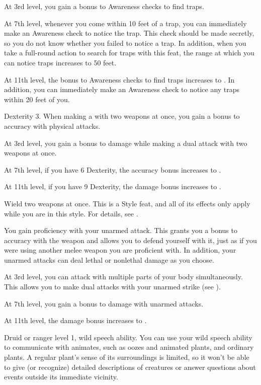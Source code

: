     At 3rd level, you gain a  bonus to Awareness checks to find traps.

    At 7th level, whenever you come within 10 feet of a trap, you can immediately make an Awareness check to notice the trap.
    This check should be made secretly, so you do not know whether you failed to notice a trap.
    In addition, when you take a full-round action to search for traps with this feat, the range at which you can notice traps increases to 50 feet.

    At 11th level, the bonus to Awareness checks to find traps increases to .
    In addition, you can immediately make an Awareness check to notice any traps within 20 feet of you.

    \featpre Dexterity 3.
    \featben When making a  with two weapons at once, you gain a  bonus to accuracy with physical attacks.

    At 3rd level, you gain a  bonus to damage while making a dual attack with two weapons at once.

    At 7th level, if you have 6 Dexterity, the accuracy bonus increases to .

    At 11th level, if you have 9 Dexterity, the damage bonus increases to .

    \stylereq Wield two weapons at once.
     This is a Style feat, and all of its effects only apply while you are in this style.
    For details, see .

    \featben You gain proficiency with your unarmed attack.
    This grants you a  bonus to accuracy with the weapon and allows you to defend yourself with it, just as if you were using another melee weapon you are proficient with.
    In addition, your unarmed attacks can deal lethal or nonlethal damage as you choose.

    At 3rd level, you can attack with multiple parts of your body simultaneously.
    This allows you to make dual attacks with your unarmed strike (see ).

    At 7th level, you gain a  bonus to damage with unarmed attacks.

    At 11th level, the damage bonus increases to .

    \featpres Druid or ranger level 1, wild speech ability.
    \featben You can use your wild speech ability to communicate with animates, such as oozes and animated plants, and ordinary plants. A regular plant's sense of its surroundings is limited, so it won't be able to give (or recognize) detailed descriptions of creatures or answer questions about events outside its immediate vicinity.

